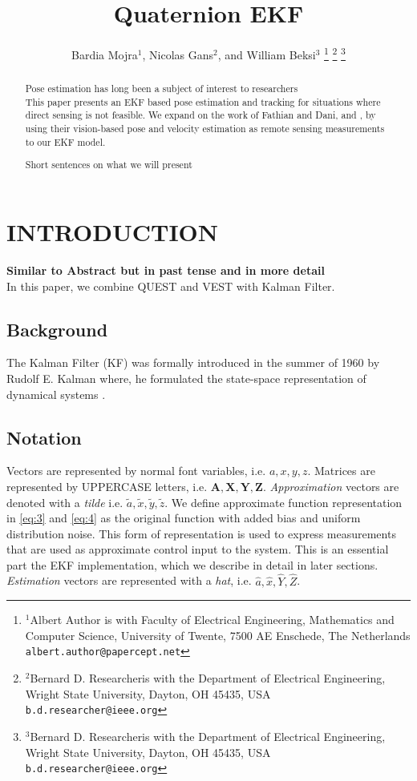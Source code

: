 \documentclass[letterpaper, 10 pt, conference]{ieeeconf}  %
\title{\LARGE \bf Quaternion EKF }
\author{Bardia Mojra$^{1}$, Nicolas Gans$^{2}$, and William Beksi$^{3}$%
\thanks{$^{1}$Albert Author is with Faculty of Electrical Engineering, Mathematics and Computer Science,
        University of Twente, 7500 AE Enschede, The Netherlands
        {\tt\small albert.author@papercept.net}}%
\thanks{$^{2}$Bernard D. Researcheris with the Department of Electrical Engineering, Wright State University,
        Dayton, OH 45435, USA
        {\tt\small b.d.researcher@ieee.org}}%
\thanks{$^{3}$Bernard D. Researcheris with the Department of Electrical Engineering, Wright State University,
        Dayton, OH 45435, USA
        {\tt\small b.d.researcher@ieee.org}}%
}
\begin{document}
\maketitle
\thispagestyle{empty}
\pagestyle{empty}


\begin{abstract}

Pose estimation has long been a subject of interest to researchers\\

This paper presents an EKF based pose estimation and tracking for situations where direct sensing is not feasible. We expand on the work of Fathian and Dani, \cite{quest} and \cite{vest}, by using their vision-based pose and velocity estimation as remote sensing measurements to our EKF model.


Short sentences on what we will present

\end{abstract}


\section{INTRODUCTION}

\textbf{Similar to Abstract but in past tense and in more detail}\\

In this paper, we combine QUEST and VEST with Kalman Filter.\\

\subsection{Background}

The Kalman Filter (KF) was formally introduced in the summer of 1960 by Rudolf E. Kalman where, he formulated the state-space representation of dynamical systems \cite{KF}.




\subsection{Notation}
Vectors are represented by normal font variables, i.e. $a,x,y,z$.
Matrices are represented by UPPERCASE letters, i.e. $\mathbf{A,X,Y,Z}$.
\textit{Approximation} vectors are denoted with a \textit{tilde} i.e. $\widetilde{a},\widetilde{x},\widetilde{y},\widetilde{z}$.
We define approximate function representation
in \ref{eq:3} and \ref{eq:4} as the original function with added bias and uniform distribution noise.
This form of representation is used to express measurements that
are used as approximate control input to the system. This is an essential part the EKF
implementation, which we describe in detail in later sections.
\textit{Estimation} vectors are represented with a \textit{hat}, i.e. \(\widehat{a},\widehat{x},\widehat{Y},\widehat{Z}\).
\end{document}
